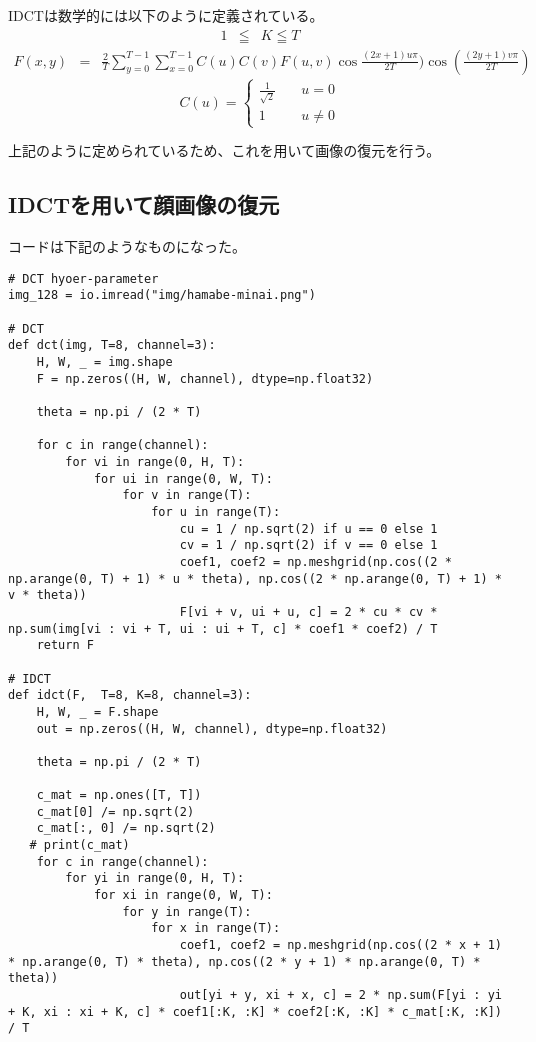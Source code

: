 \documentclass[dvipdfmx,uplatex]{jsarticle}
\begin{document}
\begin{spacing}{1.4}
IDCTは数学的には以下のように定義されている。
\begin{eqnarray*}
1 &\leqq& K \leqq T
\end{eqnarray*}
\begin{eqnarray}
F(x, y) &=& \frac{2}{T}\sum_{y=0}^{T-1}\sum_{x=0}^{T-1}C(u)C(v)F(u, v)\cos\frac{(2x + 1)u\pi}{2T})\cos(\frac{(2y + 1)v\pi}{2T})
\end{eqnarray}
\[\displaystyle
C(u) =
\begin{cases}
\frac{1}{\sqrt{2}} & \quad u = 0 \\
1 & \quad u \neq 0
\end{cases}
\]

上記のように定められているため、これを用いて画像の復元を行う。

\subsection{IDCTを用いて顔画像の復元}
コードは下記のようなものになった。
\begin{lstlisting}[caption=DCT係数を元に画像を復元するソースコード]
# DCT hyoer-parameter
img_128 = io.imread("img/hamabe-minai.png")

# DCT
def dct(img, T=8, channel=3):
    H, W, _ = img.shape
    F = np.zeros((H, W, channel), dtype=np.float32)

    theta = np.pi / (2 * T)

    for c in range(channel):
        for vi in range(0, H, T):
            for ui in range(0, W, T):
                for v in range(T):
                    for u in range(T):
                        cu = 1 / np.sqrt(2) if u == 0 else 1
                        cv = 1 / np.sqrt(2) if v == 0 else 1
                        coef1, coef2 = np.meshgrid(np.cos((2 * np.arange(0, T) + 1) * u * theta), np.cos((2 * np.arange(0, T) + 1) * v * theta))
                        F[vi + v, ui + u, c] = 2 * cu * cv * np.sum(img[vi : vi + T, ui : ui + T, c] * coef1 * coef2) / T
    return F

# IDCT
def idct(F,  T=8, K=8, channel=3):
    H, W, _ = F.shape
    out = np.zeros((H, W, channel), dtype=np.float32)

    theta = np.pi / (2 * T)

    c_mat = np.ones([T, T])
    c_mat[0] /= np.sqrt(2)
    c_mat[:, 0] /= np.sqrt(2)
   # print(c_mat)
    for c in range(channel):
        for yi in range(0, H, T):
            for xi in range(0, W, T):
                for y in range(T):
                    for x in range(T):
                        coef1, coef2 = np.meshgrid(np.cos((2 * x + 1) * np.arange(0, T) * theta), np.cos((2 * y + 1) * np.arange(0, T) * theta))
                        out[yi + y, xi + x, c] = 2 * np.sum(F[yi : yi + K, xi : xi + K, c] * coef1[:K, :K] * coef2[:K, :K] * c_mat[:K, :K]) / T


\end{lstlisting}
\end{spacing}
\end{document}
